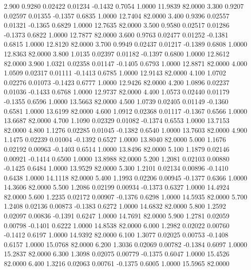    2.900   0.9280   0.02422   0.01234  -0.1432   0.7054   1.0000  11.9839  82.0000
   3.300   0.9207   0.02597   0.01355  -0.1357   0.6835   1.0000  12.7404  82.0000
   3.400   0.9396   0.02557   0.01321  -0.1365   0.6829   1.0000  12.7635  82.0000
   3.500   0.9580   0.02517   0.01286  -0.1373   0.6822   1.0000  12.7877  82.0000
   3.600   0.9763   0.02477   0.01252  -0.1381   0.6815   1.0000  12.8120  82.0000
   3.700   0.9949   0.02437   0.01217  -0.1389   0.6808   1.0000  12.8363  82.0000
   3.800   1.0135   0.02397   0.01182  -0.1397   0.6800   1.0000  12.8612  82.0000
   3.900   1.0321   0.02358   0.01147  -0.1405   0.6793   1.0000  12.8871  82.0000
   4.000   1.0509   0.02317   0.01111  -0.1413   0.6785   1.0000  12.9143  82.0000
   4.100   1.0702   0.02276   0.01073  -0.1423   0.6777   1.0000  12.9426  82.0000
   4.200   1.0896   0.02237   0.01036  -0.1433   0.6768   1.0000  12.9737  82.0000
   4.400   1.0573   0.02440   0.01179  -0.1355   0.6596   1.0000  13.5663  82.0000
   4.500   1.0739   0.02405   0.01149  -0.1360   0.6581   1.0000  13.6199  82.0000
   4.600   1.0912   0.02368   0.01117  -0.1367   0.6566   1.0000  13.6687  82.0000
   4.700   1.1090   0.02329   0.01082  -0.1374   0.6553   1.0000  13.7153  82.0000
   4.800   1.1276   0.02285   0.01045  -0.1382   0.6540   1.0000  13.7603  82.0000
   4.900   1.1475   0.02239   0.01004  -0.1392   0.6527   1.0000  13.8040  82.0000
   5.000   1.1676   0.02192   0.00963  -0.1403   0.6514   1.0000  13.8496  82.0000
   5.100   1.1879   0.02146   0.00921  -0.1414   0.6500   1.0000  13.8988  82.0000
   5.200   1.2081   0.02103   0.00880  -0.1425   0.6484   1.0000  13.9529  82.0000
   5.300   1.2101   0.02134   0.00896  -0.1410   0.6438   1.0000  14.1118  82.0000
   5.400   1.1993   0.02206   0.00945  -0.1377   0.6366   1.0000  14.3606  82.0000
   5.500   1.2086   0.02199   0.00934  -0.1373   0.6327   1.0000  14.4924  82.0000
   5.600   1.2235   0.02172   0.00907  -0.1376   0.6298   1.0000  14.5935  82.0000
   5.700   1.2408   0.02136   0.00873  -0.1383   0.6272   1.0000  14.6832  82.0000
   5.800   1.2592   0.02097   0.00836  -0.1391   0.6247   1.0000  14.7691  82.0000
   5.900   1.2781   0.02059   0.00798  -0.1401   0.6222   1.0000  14.8538  82.0000
   6.000   1.2982   0.02022   0.00760  -0.1412   0.6197   1.0000  14.9392  82.0000
   6.100   1.3077   0.02025   0.00753  -0.1408   0.6157   1.0000  15.0768  82.0000
   6.200   1.3036   0.02069   0.00782  -0.1384   0.6097   1.0000  15.2837  82.0000
   6.300   1.3098   0.02075   0.00779  -0.1375   0.6047   1.0000  15.4526  82.0000
   6.400   1.3216   0.02063   0.00761  -0.1375   0.6005   1.0000  15.5965  82.0000
